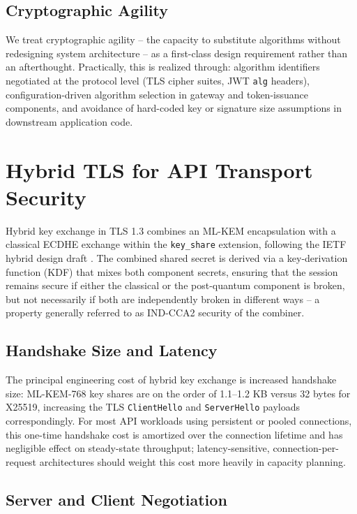 \documentclass[conference]{IEEEtran}
\begin{document}
\subsection{Cryptographic Agility}

We treat cryptographic agility -- the capacity to substitute algorithms
without redesigning system architecture -- as a first-class design
requirement rather than an afterthought. Practically, this is realized
through: algorithm identifiers negotiated at the protocol level (TLS
cipher suites, JWT \texttt{alg} headers), configuration-driven algorithm
selection in gateway and token-issuance components, and avoidance of
hard-coded key or signature size assumptions in downstream application
code.

\section{Hybrid TLS for API Transport Security}

Hybrid key exchange in TLS 1.3 combines an ML-KEM encapsulation with a
classical ECDHE exchange within the \texttt{key\_share} extension,
following the IETF hybrid design draft \cite{ietf_hybrid_kex}. The combined
shared secret is derived via a key-derivation function (KDF) that mixes
both component secrets, ensuring that the session remains secure if either
the classical or the post-quantum component is broken, but not necessarily
if both are independently broken in different ways -- a property generally
referred to as IND-CCA2 security of the combiner.

\subsection{Handshake Size and Latency}

The principal engineering cost of hybrid key exchange is increased
handshake size: ML-KEM-768 key shares are on the order of 1.1--1.2 KB
versus 32 bytes for X25519, increasing the TLS \texttt{ClientHello} and
\texttt{ServerHello} payloads correspondingly. For most API workloads using
persistent or pooled connections, this one-time handshake cost is
amortized over the connection lifetime and has negligible effect on
steady-state throughput; latency-sensitive, connection-per-request
architectures should weight this cost more heavily in capacity planning.

\subsection{Server and Client Negotiation}
\end{document}
